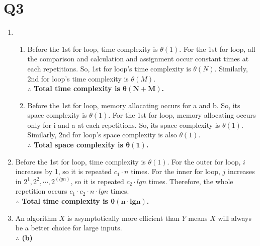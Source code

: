 \documentclass[12pt,a4paper]{article}
\begin{document}
    \section{Q3}
    \begin{enumerate}[label=(\arabic*)]
        \item
            \begin{enumerate}
                \item
                    Before the 1st for loop, time complexity is $\theta(1)$.
                    For the 1st for loop, all the comparison and calculation and assignment occur constant times at each repetitions.
                    So, 1st for loop's time complexity is $\theta(N)$.
                    Similarly, 2nd for loop's time complexity is $\theta(M)$.\\
                    \textbf{$\therefore$ Total time complexity is $\mathbf{\theta(N+M)}$.}
                \item
                    Before the 1st for loop, memory allocating occurs for a and b. So, its space complexity is $\theta(1)$.
                    For the 1st for loop, memory allocating occurs only for i and a at each repetitions. So, its space complexity is $\theta(1)$.
                    Similarly, 2nd for loop's space complexity is also $\theta(1)$.\\
                    \textbf{$\therefore$ Total space complexity is $\mathbf{\theta(1)}$.}
            \end{enumerate}
        \item
            Before the 1st for loop, time complexity is $\theta(1)$.
            For the outer for loop, $i$ increases by 1, so it is repeated $c_1\cdot n$ times.
            For the inner for loop, $j$ increases in $2^1, 2^2, \cdots, 2^(lgn)$, so it is repeated $c_2\cdot lgn$ times.
            Therefore, the whole repetition occurs $c_1\cdot c_2\cdot n\cdot lgn$ times.\\
            \textbf{$\therefore$ Total time complexity is $\mathbf{\theta(n\cdot lgn)}$.}

        \item
            An algorithm $X$ is asymptotically more efficient than $Y$ means $X$ will always be a better choice for large inputs.\\
            \textbf{$\therefore$ (b)}

    \end{enumerate}
\end{document}
